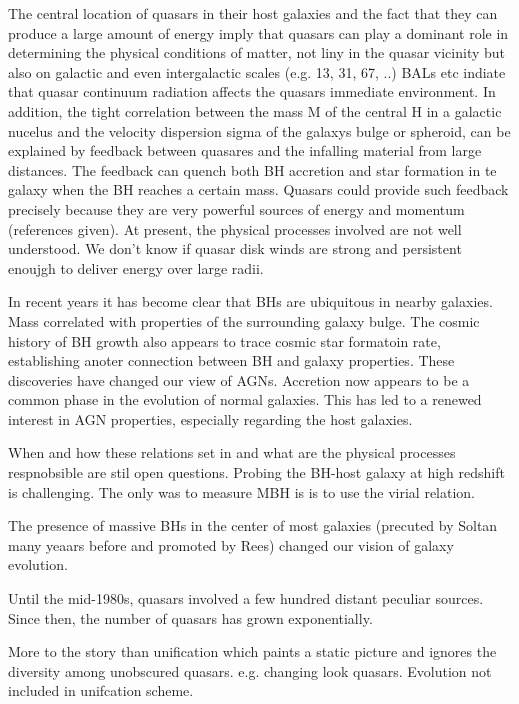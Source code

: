 The central location of quasars in their host galaxies and the fact that they can produce a large amount of energy imply that quasars can play a dominant role in determining the physical conditions of matter, not liny in the quasar vicinity but also on galactic and even intergalactic scales (e.g. 13, 31, 67, ..) 
BALs etc indiate that quasar continuum radiation affects the quasars immediate environment.  In addition, the tight correlation between the mass M of the central H in a galactic nucelus and the velocity dispersion sigma of the galaxys bulge or spheroid, can be explained by feedback between quasares and the infalling material from large distances.  The feedback can quench both BH accretion and star formation in te galaxy when the BH reaches a certain mass. Quasars could provide such feedback precisely because they are very powerful sources of energy and momentum (references given). At present, the physical processes involved are not well understood. We don't know if quasar disk winds are strong and persistent enoujgh to deliver energy over large radii. 

In recent years it has become clear that BHs are ubiquitous in nearby galaxies. 
Mass correlated with properties of the surrounding galaxy bulge. 
The cosmic history of BH growth also appears to trace cosmic star formatoin rate, establishing anoter connection between BH and galaxy properties. 
These discoveries have changed our view of AGNs.
Accretion now appears to be a common phase in the evolution of normal galaxies. 
This has led to a renewed interest in AGN properties, especially regarding the host galaxies. 

When and how these relations set in and what are the physical processes respnobsible are stil  open questions. 
Probing the BH-host galaxy at high redshift is challenging. 
The only was to measure MBH is is to use the virial relation. 

The presence of massive BHs in the center of most galaxies (precuted by Soltan many yeaars before and promoted by Rees) changed our vision of galaxy evolution. 

Until the mid-1980s, quasars involved a few hundred distant peculiar sources.
Since then, the number of quasars has grown exponentially.

More to the story than unification which paints a static picture and ignores the diversity among unobscured quasars. e.g. changing look quasars. Evolution not included in unifcation scheme. 



